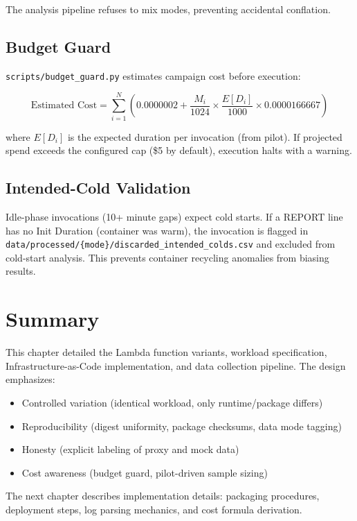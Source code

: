 The analysis pipeline refuses to mix modes, preventing accidental conflation.

\subsection{Budget Guard}

\texttt{scripts/budget\_guard.py} estimates campaign cost before execution:

\begin{equation}
\text{Estimated Cost} = \sum_{i=1}^{N} \left(0.0000002 + \frac{M_i}{1024} \times \frac{E[D_i]}{1000} \times 0.0000166667\right)
\end{equation}

where $E[D_i]$ is the expected duration per invocation (from pilot). If projected spend exceeds the configured cap (\$5 by default), execution halts with a warning.

\subsection{Intended-Cold Validation}

Idle-phase invocations (10+ minute gaps) expect cold starts. If a REPORT line has no Init Duration (container was warm), the invocation is flagged in \texttt{data/processed/\{mode\}/discarded\_intended\_colds.csv} and excluded from cold-start analysis. This prevents container recycling anomalies from biasing results.

\section{Summary}

This chapter detailed the Lambda function variants, workload specification, Infrastructure-as-Code implementation, and data collection pipeline. The design emphasizes:

\begin{itemize}
    \item Controlled variation (identical workload, only runtime/package differs)
    \item Reproducibility (digest uniformity, package checksums, data mode tagging)
    \item Honesty (explicit labeling of proxy and mock data)
    \item Cost awareness (budget guard, pilot-driven sample sizing)
\end{itemize}

The next chapter describes implementation details: packaging procedures, deployment steps, log parsing mechanics, and cost formula derivation.
